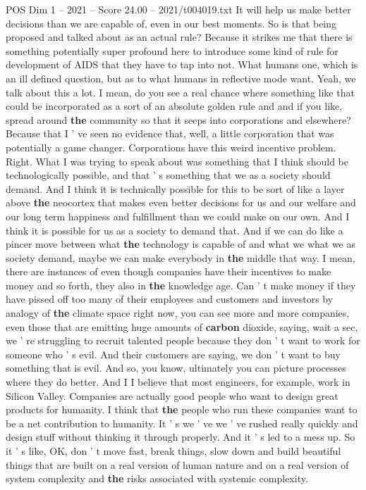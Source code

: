 \begin{textsample}{POS Dim 1 – 2021 – Score 24.00 – 2021/t004019.txt}
It will help us make better decisions than we are capable of, even in our best moments.
So is that being proposed and talked about as an actual rule?
Because it strikes me that there is something potentially super profound here to introduce some kind of rule for development of AIDS that they have to tap into not.
What humans one, which is an ill defined question, but as to what humans in reflective mode want.
Yeah, we talk about this a lot.
I mean, do you see a real chance where something like that could be incorporated as a sort of an absolute golden rule and and if you like, spread around \textbf{the} community so that it seeps into corporations and elsewhere?
Because that I ' ve seen no evidence that, well, a little corporation that was potentially a game changer.
Corporations have this weird incentive problem.
Right.
What I was trying to speak about was something that I think should be technologically possible, and that ' s something that we as a society should demand.
And I think it is technically possible for this to be sort of like a layer above \textbf{the} neocortex that makes even better decisions for us and our welfare and our long term happiness and fulfillment than we could make on our own.
And I think it is possible for us as a society to demand that.
And if we can do like a pincer move between what \textbf{the} technology is capable of and what we what we as society demand, maybe we can make everybody in \textbf{the} middle that way.
I mean, there are instances of even though companies have their incentives to make money and so forth, they also in \textbf{the} knowledge age.
Can ' t make money if they have pissed off too many of their employees and customers and investors by analogy of \textbf{the} climate space right now, you can see more and more companies, even those that are emitting huge amounts of \textbf{carbon} dioxide, saying, wait a sec, we ' re struggling to recruit talented people because they don ' t want to work for someone who ' s evil.
And their customers are saying, we don ' t want to buy something that is evil.
And so, you know, ultimately you can picture processes where they do better.
And I I believe that most engineers, for example, work in Silicon Valley.
Companies are actually good people who want to design great products for humanity.
I think that \textbf{the} people who run these companies want to be a net contribution to humanity.
It ' s we ' ve we ' ve rushed really quickly and design stuff without thinking it through properly.
And it ' s led to a mess up.
So it ' s like, OK, don ' t move fast, break things, slow down and build beautiful things that are built on a real version of human nature and on a real version of system complexity and \textbf{the} risks associated with systemic complexity.

\end{textsample}

